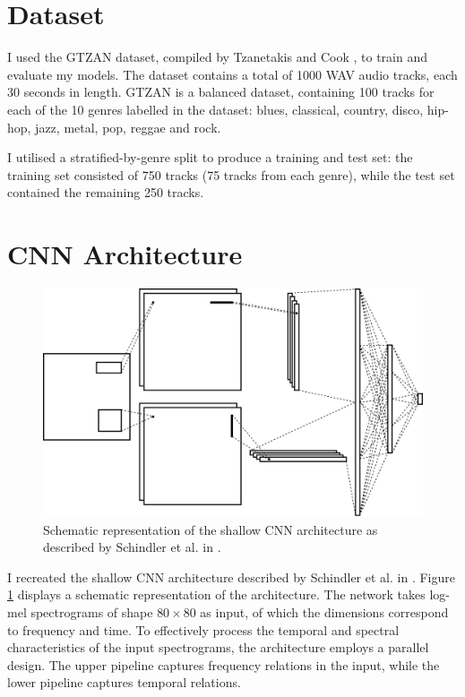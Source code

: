 \documentclass[conference]{IEEEtran}
\begin{document}
\section{Dataset}

I used the GTZAN dataset, compiled by Tzanetakis and Cook \cite{TzanetakisCook}, to train and evaluate my models.
The dataset contains a total of 1000 WAV audio tracks, each 30 seconds in length.
GTZAN is a balanced dataset, containing 100 tracks for each of the 10 genres labelled in the dataset: blues, classical, country, disco, hip-hop, jazz, metal, pop, reggae and rock.

I utilised a stratified-by-genre split to produce a training and test set: the training set consisted of 750 tracks (75 tracks from each genre), while the test set contained the remaining 250 tracks.

\section{CNN Architecture}

\begin{figure}[htbp]
    \centerline{\includegraphics[width=\columnwidth]{architecture.jpg}}
    \caption{Schematic representation of the shallow CNN architecture as described by Schindler et al. in \cite{SchindlerLidyRauber}.}
    \label{architecture}
\end{figure}

I recreated the shallow CNN architecture described by Schindler et al. in \cite{SchindlerLidyRauber}.
Figure \ref{architecture} displays a schematic representation of the architecture.
The network takes log-mel spectrograms of shape $80\times80$ as input, of which the dimensions correspond to frequency and time.
To effectively process the temporal and spectral characteristics of the input spectrograms, the architecture employs a parallel design.
The upper pipeline captures frequency relations in the input, while the lower pipeline captures temporal relations.
\end{document}

